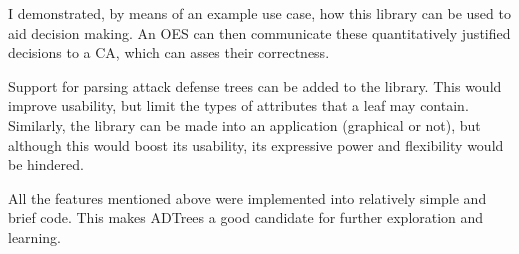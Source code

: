 \documentclass{scrreprt}
\begin{document}
I demonstrated, by means of an example use case, how this library can be used to
aid decision making. An OES can then communicate these quantitatively justified
decisions to a CA, which can asses their correctness.

Support for parsing attack defense trees can be added to the library. This would
improve usability, but limit the types of attributes that a leaf may contain.
Similarly, the library can be made into an application (graphical or not), but
although this would boost its usability, its expressive power and flexibility
would be hindered. 

All the features mentioned above were implemented into relatively simple and
brief code. This makes ADTrees a good candidate for further exploration and
learning.



\end{document}
